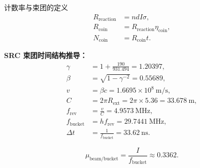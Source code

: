 \documentclass[aspectratio=169]{ctexbeamer}
\begin{document}
\begin{frame}{计数率与束团的定义}
\small
\begin{align*}
R_{\mathrm{reaction}} &= n d I \sigma, \\
R_{\mathrm{coin}} &= R_{\mathrm{reaction}} \eta_{\mathrm{coin}}, \\
N_{\mathrm{coin}} &= R_{\mathrm{coin}} t.
\end{align*}

\vspace{0.1cm}
\textbf{SRC 束团时间结构推导：}
\begin{align*}
\gamma &= 1 + \frac{190}{931.494} = 1.20397, \\
\beta &= \sqrt{1-\gamma^{-2}} = 0.55689, \\
v &= \beta c = 1.6695\times 10^8~\mathrm{m/s}, \\
C &= 2\pi R_{\mathrm{ext}} = 2\pi \times 5.36 = 33.678~\mathrm{m}, \\
f_{\mathrm{rev}} &= \frac{v}{C} = 4.9573~\mathrm{MHz}, \\
f_{\mathrm{bucket}} &= h f_{\mathrm{rev}} = 29.7441~\mathrm{MHz}, \\
\Delta t &= \frac{1}{f_{\mathrm{bucket}}} = 33.62~\mathrm{ns}.
\end{align*}

\[
\mu_{\mathrm{beam/bucket}} = \frac{I}{f_{\mathrm{bucket}}} \approx 0.3362.
\]
\end{frame}
\end{document}
